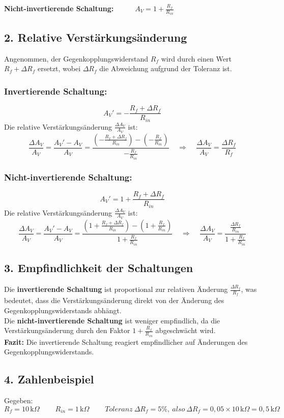 \documentclass[a4paper,12pt]{article}
\begin{document}
\noindent \textbf{Nicht-invertierende Schaltung:}~~~~~~\(A_V = 1 + \frac{R_f}{R_{in}}\)


\subsection*{2. Relative Verstärkungsänderung}
Angenommen, der Gegenkopplungswiderstand \( R_f \) wird durch einen Wert \( R_f + \Delta R_f \) ersetzt, wobei \( \Delta R_f \) die Abweichung aufgrund der Toleranz ist.
\subsubsection*{Invertierende Schaltung:}
\[
A_V' = -\frac{R_f + \Delta R_f}{R_{in}}
\]
Die relative Verstärkungsänderung \( \frac{\Delta A_V}{A_V} \) ist:
\[
\frac{\Delta A_V}{A_V} = \frac{A_V' - A_V}{A_V} = \frac{\left( -\frac{R_f + \Delta R_f}{R_{in}} \right) - \left( -\frac{R_f}{R_{in}} \right)}{-\frac{R_f}{R_{in}}}~~~~~\Rightarrow~~~~~\frac{\Delta A_V}{A_V} = \frac{\Delta R_f}{R_f}
\]


\subsubsection*{Nicht-invertierende Schaltung:}
\[
A_V' = 1 + \frac{R_f + \Delta R_f}{R_{in}}
\]
Die relative Verstärkungsänderung \( \frac{\Delta A_V}{A_V} \) ist:
\[
\frac{\Delta A_V}{A_V} = \frac{A_V' - A_V}{A_V} = \frac{\left( 1 + \frac{R_f + \Delta R_f}{R_{in}} \right) - \left( 1 + \frac{R_f}{R_{in}} \right)}{1 + \frac{R_f}{R_{in}}}~~~~~\Rightarrow~~~~~\frac{\Delta A_V}{A_V} = \frac{\frac{\Delta R_f}{R_{in}}}{1 + \frac{R_f}{R_{in}}}
\]


\subsection*{3. Empfindlichkeit der Schaltungen}
Die \textbf{invertierende Schaltung} ist proportional zur relativen Änderung \( \frac{\Delta R_f}{R_f} \), was bedeutet, dass die Verstärkungsänderung direkt von der Änderung des Gegenkopplungswiderstands abhängt.\\
\noindent Die \textbf{nicht-invertierende Schaltung} ist weniger empfindlich, da die Verstärkungsänderung durch den Faktor \( 1 + \frac{R_f}{R_{in}} \) abgeschwächt wird.\\
\noindent \textbf{Fazit:} Die invertierende Schaltung reagiert empfindlicher auf Änderungen des Gegenkopplungswiderstands.

\subsection*{4. Zahlenbeispiel}
Gegeben:
\[
 R_f = 10 \, \text{k}\Omega~~~~~~~~~~R_{in} = 1 \, \text{k}\Omega~~~~~~~~~~Toleranz~\Delta R_f = 5\%,~ also~\Delta R_f = 0,05 \times 10 \, \text{k}\Omega = 0,5 \, \text{k}\Omega
\]
\end{document}
